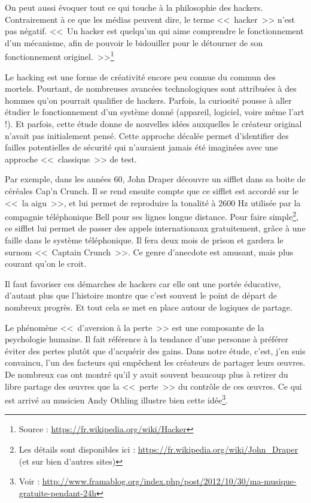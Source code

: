 On peut aussi évoquer tout ce qui touche à la philosophie des hackers.
Contrairement à ce que les médias peuvent dire, le terme <<~hacker~>> n'est pas négatif.
<<~Un hacker est quelqu'un qui aime comprendre le fonctionnement d'un mécanisme, afin de pouvoir le bidouiller pour le détourner de son fonctionnement originel.~>>\footnote{Source : \url{https://fr.wikipedia.org/wiki/Hacker}}

Le hacking est une forme de créativité encore peu connue du commun des mortels.
Pourtant, de nombreuses avancées technologiques sont attribuées à des hommes qu'on pourrait qualifier de hackers.
Parfois, la curiosité pousse à aller étudier le fonctionnement d'un système donné (appareil, logiciel, voire même l'art !).
Et parfois, cette étude donne de nouvelles idées auxquelles le créateur original n'avait pas initialement pensé.
Cette approche décalée permet d'identifier des failles potentielles de sécurité qui n'auraient jamais été imaginées avec une approche <<~classique~>> de test.

Par exemple, dans les années 60, John Draper découvre un sifflet dans sa boite de céréales Cap'n Crunch.
Il se rend ensuite compte que ce sifflet est accordé sur le <<~la aigu~>>, et lui permet de reproduire la tonalité à 2600 Hz utilisée par la compagnie téléphonique Bell pour ses lignes longue distance.
Pour faire simple\footnote{Les détails sont disponibles ici : \url{https://fr.wikipedia.org/wiki/John_Draper} (et sur bien d'autres sites)}, ce sifflet lui permet de passer des appels internationaux gratuitement, grâce à une faille dans le système téléphonique.
Il fera deux mois de prison et gardera le surnom <<~Captain Crunch~>>.
Ce genre d'anecdote est amusant, mais plus courant qu'on le croit.

Il faut favoriser ces démarches de hackers car elle ont une portée éducative, d'autant plus que l'histoire montre que c'est souvent le point de départ de nombreux progrès.
Et tout cela se met en place autour de logiques de partage.

Le phénomène <<~d'aversion à la perte~>> est une composante de la psychologie humaine.
Il fait référence à la tendance d'une personne à préférer éviter des pertes plutôt que d'acquérir des gains.
Dans notre étude, c'est, j'en suis convaincu, l'un des facteurs qui empêchent les créateurs de partager leurs œuvres.
De nombreux cas ont montré qu'il y avait souvent beaucoup plus à retirer du libre partage des œuvres que la <<~perte~>> du contrôle de ces œuvres.
Ce qui est arrivé au musicien Andy Othling illustre bien cette idée\footnote{Voir : \url{http://www.framablog.org/index.php/post/2012/10/30/ma-musique-gratuite-pendant-24h}}.

